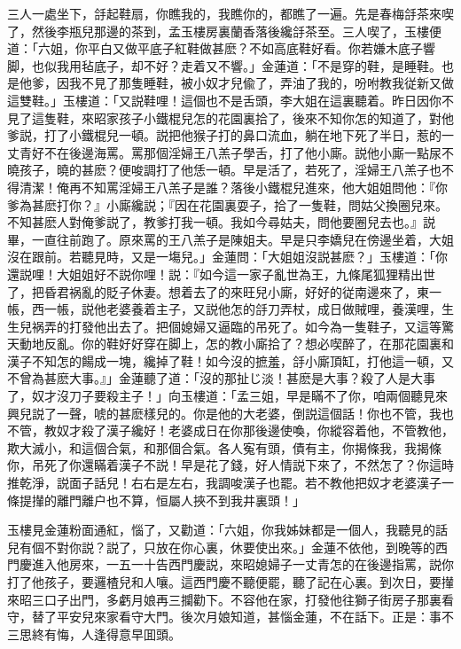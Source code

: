三人一處坐下，㧱起鞋扇，你瞧我的，我瞧你的，都瞧了一遍。先是春梅㧱茶來喫了，然後李瓶兒那邊的茶到，孟玉樓房裏蘭香落後纔㧱茶至。三人喫了，玉樓便道：「六姐，你平白又做平底子紅鞋做甚麽？不如高底鞋好看。你若嫌木底子響脚，也似我用毡底子，却不好？走着又不響。」金蓮道：「不是穿的鞋，是睡鞋。也是他爹，因我不見了那隻睡鞋，被小奴才兒偸了，弄油了我的，吩咐教我従新又做這雙鞋。」玉樓道：「又説鞋哩！這個也不是舌頭，李大姐在這裏聽着。昨日因你不見了這隻鞋，來昭家孩子小鐵棍兒怎的花園裏拾了，後來不知你怎的知道了，對他爹説，打了小鐵棍兒一頓。説把他猴子打的鼻口流血，躺在地下死了半日，惹的一丈青好不在後邊海罵。罵那個淫婦王八羔子學舌，打了他小廝。説他小廝一點尿不曉孩子，曉的甚麽？便唆調打了他恁一頓。早是活了，若死了，淫婦王八羔子也不得清潔！俺再不知罵淫婦王八羔子是誰？落後小鐵棍兒進來，他大姐姐問他：『你爹為甚麽打你？』小廝纔説；『因在花園裏耍子，拾了一隻鞋，問姑父換圈兒來。不知甚麽人對俺爹説了，教爹打我一頓。我如今尋姑夫，問他要圈兒去也。』説畢，一直往前跑了。原來罵的王八羔子是陳姐夫。早是只李嬌兒在傍邊坐着，大姐沒在跟前。若聽見時，又是一塲兒。」金蓮問：「大姐姐沒説甚麽？」玉樓道：「你還説哩！大姐姐好不説你哩！説：『如今這一家子亂世為王，九條尾狐狸精出世了，把昏君祸亂的貶子休妻。想着去了的來旺兒小廝，好好的従南邊來了，東一帳，西一帳，説他老婆養着主子，又説他怎的㧱刀弄杖，成日做賊哩，養漢哩，生生兒祸弄的打發他出去了。把個媳婦又逼臨的吊死了。如今為一隻鞋子，又這等驚天動地反亂。你的鞋好好穿在脚上，怎的教小廝拾了？想必喫醉了，在那花園裏和漢子不知怎的餳成一塊，纔掉了鞋！如今沒的摭羞，㧱小廝頂缸，打他這一頓，又不曾為甚麽大事。』」金蓮聽了道：「沒的那扯じ淡！甚麽是大事？殺了人是大事了，奴才沒刀子要殺主子！」向玉樓道：「孟三姐，早是瞞不了你，咱兩個聽見來興兒説了一聲，唬的甚麽樣兒的。你是他的大老婆，倒説這個話！你也不管，我也不管，教奴才殺了漢子纔好！老婆成日在你那後邊使喚，你縱容着他，不管教他，欺大滅小，和這個合氣，和那個合氣。各人寃有頭，債有主，你揭條我，我揭條你，吊死了你還瞞着漢子不説！早是花了錢，好人情説下來了，不然怎了？你這時推乾淨，説面子話兒！右右是左右，我調唆漢子也罷。若不教他把奴才老婆漢子一條提攆的離門離户也不算，恒屬人挾不到我井裏頭！」

玉樓見金蓮粉面通紅，惱了，又勸道：「六姐，你我姊妹都是一個人，我聽見的話兒有個不對你説？説了，只放在你心裏，休要使出來。」金蓮不依他，到晚等的西門慶進入他房來，一五一十告西門慶説，來昭媳婦子一丈青怎的在後邊指罵，説你打了他孩子，要邏楂兒和人嚷。這西門慶不聽便罷，聽了記在心裏。到次日，要攆來昭三口子出門，多虧月娘再三攔勸下。不容他在家，打發他往獅子街房子那裏看守，替了平安兒來家看守大門。後次月娘知道，甚惱金蓮，不在話下。正是：事不三思終有悔，人逢得意早囬頭。

